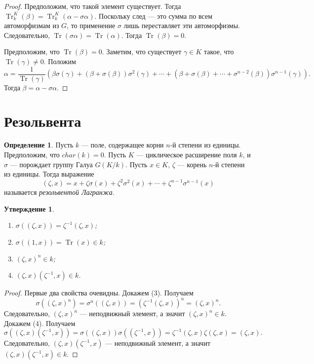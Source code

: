 \documentclass[12pt, titlepage, oneside]{amsbook}
\newcommand{\Tr}{\operatorname{Tr}}
\newtheorem{claim}[theorem]{Утверждение}
\theoremstyle{definition}
\newtheorem{definition}[theorem]{Определение}
\theoremstyle{remark}
\begin{document}
\begin{proof}
Предположим, что такой элемент существует. Тогда $\Tr_k^K(\beta)=\Tr_k^K(\alpha-\sigma \alpha)$. Поскольку след --- это сумма по всем автоморфизмам из $G$, то применение $\sigma$ лишь переставляет эти автоморфизмы. Следовательно, $\Tr(\sigma\alpha)=\Tr(\alpha)$. Тогда $\Tr(\beta)=0$.

Предположим, что $\Tr(\beta)=0$. Заметим, что существует $\gamma\in K$ такое, что $\Tr(\gamma)\neq 0$. Положим
 $$\alpha=\frac{1}{\Tr(\gamma)}(\beta\sigma(\gamma)+(\beta+\sigma(\beta))\sigma^2(\gamma)+\cdots+(\beta+\sigma(\beta)+\cdots+\sigma^{n-2}(\beta))\sigma^{n-1}(\gamma)).$$ Тогда $\beta=\alpha-\sigma\alpha$.
\end{proof}

\section{Резольвента}

\begin{definition}
Пусть $k$ --- поле, содержащее корни $n$-й степени из единицы. Предположим, что $char(k)=0$. Пусть $K$ --- циклическое расширение поля $k$, и $\sigma$ --- порождает группу Галуа $G(K/k)$. Пусть $x\in K$, $\zeta$ --- корень $n$-й степени из единицы. Тогда выражение $$(\zeta,x)=x+\zeta\sigma(x)+\zeta^2\sigma^2(x)+\cdots+\zeta^{n-1}\sigma^{n-1}(x)$$ называется \emph{резольвентой Лагранжа}.
\end{definition}

\begin{claim}
\label{Res1}
\begin{enumerate}
\item $\sigma((\zeta,x))=\zeta^{-1}(\zeta,x)$;
\item $\sigma((1,x))=\Tr(x)\in k$;
\item $(\zeta,x)^n\in k$;
\item $(\zeta,x)(\zeta^{-1},x)\in k$.
\end{enumerate}
\end{claim}

\begin{proof}
Первые два свойства очевидны. Докажем (3). Получаем $$\sigma((\zeta,x)^n)=\sigma^n((\zeta,x))=(\zeta^{-1}(\zeta,x))^n=(\zeta,x)^n.$$ Следовательно, $(\zeta,x)^n$ --- неподвижный элемент, а значит $(\zeta,x)^n\in k$. Докажем (4). Получаем $$\sigma((\zeta,x)(\zeta^{-1},x))=\sigma((\zeta,x))\sigma((\zeta^{-1},x))=\zeta^{-1}(\zeta,x)\zeta(\zeta,x)=(\zeta,x).$$ Следовательно, $(\zeta,x)(\zeta^{-1},x)$ --- неподвижный элемент, а значит $(\zeta,x)(\zeta^{-1},x)\in k$.
\end{proof}
\end{document}
